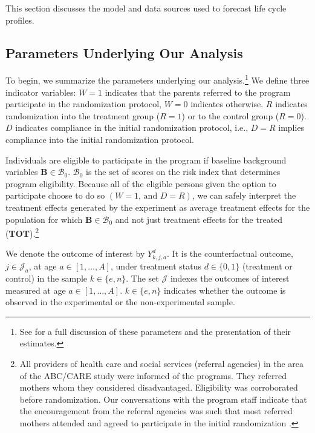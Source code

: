 This section discusses the model and data sources used to forecast life cycle profiles.

\subsection{Parameters Underlying Our Analysis}
\label{section:methodsquestions}

To begin, we summarize the parameters underlying our analysis.\footnote{See \citet{Garcia_Heckman_Ziff_2017_Gender-Diff_UNPUBLISHED} for a full discussion of these parameters and the presentation of their estimates.} We define three indicator variables: $W = 1$ indicates that the parents referred to the program participate in the randomization protocol, $W = 0$ indicates otherwise. $R$ indicates randomization into the treatment group ($R = 1$) or to the control group ($R = 0$). $D$ indicates compliance in the initial randomization protocol, i.e., $D = R$ implies compliance into the initial randomization protocol.

Individuals are eligible to participate in the program if baseline background variables $\bm{B}\in\mathcal{B}_0$. $\mathcal{B}_0$ is the set of scores on the risk index that determines program eligibility. Because all of the eligible persons given the option to participate choose to do so $(W=1\text{, and } D=R)$, we can safely interpret the treatment effects generated by the experiment as average treatment effects for the population for which $\bm{B}\in\mathcal{B}_0$ and not just treatment effects for the treated (\textbf{TOT}).\footnote{All providers of health care and social services (referral agencies) in the area of the ABC/CARE study were informed of the programs. They referred mothers whom they considered disadvantaged. Eligibility was corroborated before randomization. Our conversations with the program staff indicate that the encouragement from the referral agencies was such that most referred mothers attended and agreed to participate in the initial randomization \citep{Ramey-etal_2012-ABC}.}

We denote the outcome of interest by $Y_{k,j,a}^d$. It is the counterfactual outcome, $j \in \mathcal{J}_a$, at age $a \in [1, \ldots, A]$, under treatment status $d \in \{0, 1\}$ (treatment or control) in the sample $k \in \{e, n \}$. The set $\mathcal{J}$ indexes the outcomes of interest measured at age $a \in [1, \ldots, A]$. $k \in \{e, n\}$ indicates whether the outcome is observed in the experimental or the non-experimental sample.

